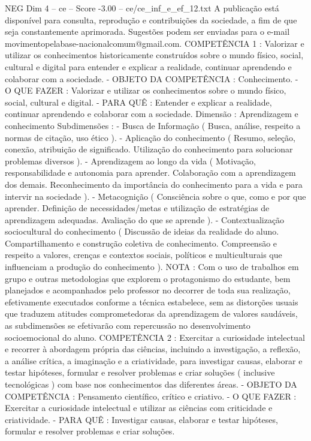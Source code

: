 \begin{textsample}{NEG Dim 4 – ce – Score -3.00 – ce/ce\_inf\_e\_ef\_12.txt}
A publicação está disponível para consulta, reprodução e contribuições da sociedade, a fim de que seja constantemente aprimorada.
Sugestões podem ser enviadas para o e-mail movimentopelabase-nacionalcomum@gmail.com.
COMPETÊNCIA 1 : Valorizar e utilizar os conhecimentos historicamente construídos sobre o mundo físico, social, cultural e digital para entender e explicar a realidade, continuar aprendendo e colaborar com a sociedade. - OBJETO DA COMPETÊNCIA : Conhecimento. - O QUE FAZER : Valorizar e utilizar os conhecimentos sobre o mundo físico, social, cultural e digital. - PARA QUÊ : Entender e explicar a realidade, continuar aprendendo e colaborar com a sociedade.
Dimensão : Aprendizagem e conhecimento Subdimensões : - Busca de Informação ( Busca, análise, respeito a normas de citação, uso ético ). - Aplicação do conhecimento ( Resumo, seleção, conexão, atribuição de significado.
Utilização do conhecimento para solucionar problemas diversos ). - Aprendizagem ao longo da vida ( Motivação, responsabilidade e autonomia para aprender.
Colaboração com a aprendizagem dos demais.
Reconhecimento da importância do conhecimento para a vida e para intervir na sociedade ). - Metacognição ( Consciência sobre o que, como e por que aprender.
Definição de necessidades/metas e utilização de estratégias de aprendizagem adequadas.
Avaliação do que se aprende ). - Contextualização sociocultural do conhecimento ( Discussão de ideias da realidade do aluno.
Compartilhamento e construção coletiva de conhecimento.
Compreensão e respeito a valores, crenças e contextos sociais, políticos e multiculturais que influenciam a produção do conhecimento ).
NOTA : Com o uso de trabalhos em grupo e outras metodologias que explorem o protagonismo do estudante, bem planejados e acompanhados pelo professor no decorrer de toda sua realização, efetivamente executados conforme a técnica estabelece, sem as distorções usuais que traduzem atitudes comprometedoras da aprendizagem de valores saudáveis, as subdimensões se efetivarão com repercussão no desenvolvimento socioemocional do aluno.
COMPETÊNCIA 2 : Exercitar a curiosidade intelectual e recorrer à abordagem própria das ciências, incluindo a investigação, a reflexão, a análise crítica, a imaginação e a criatividade, para investigar causas, elaborar e testar hipóteses, formular e resolver problemas e criar soluções ( inclusive tecnológicas ) com base nos conhecimentos das diferentes áreas. - OBJETO DA COMPETÊNCIA : Pensamento científico, crítico e criativo. - O QUE FAZER : Exercitar a curiosidade intelectual e utilizar as ciências com criticidade e criatividade. - PARA QUÊ : Investigar causas, elaborar e testar hipóteses, formular e resolver problemas e criar soluções.

\end{textsample}
